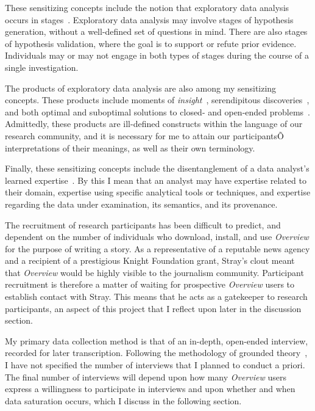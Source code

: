 These sensitizing concepts include the notion that exploratory data analysis occurs in stages~\cite{Pirolli2009}. 
Exploratory data analysis may involve stages of hypothesis generation, without a well-defined set of questions in mind. 
There are also stages of hypothesis validation, where the goal is to support or refute prior evidence. 
Individuals may or may not engage in both types of stages during the course of a single investigation. 

The products of exploratory data analysis are also among my sensitizing concepts. 
These products include moments of {\it insight}~\cite{Chang2009,North2006,Yi2008}, serendipitous discoveries~\cite{Andre2009}, and both optimal and suboptimal solutions to closed- and open-ended problems~\cite{Mayr2010}. 
Admittedly, these products are ill-defined constructs within the language of our research community, and it is necessary for me to attain our participantsÕ interpretations of their meanings, as well as their own terminology.

Finally, these sensitizing concepts include the disentanglement of a data analyst's learned expertise~\cite{Chang2010}. 
By this I mean that an analyst may have expertise related to their domain, expertise using specific analytical tools or techniques, and expertise regarding the data under examination, its semantics, and its provenance.

The recruitment of research participants has been difficult to predict, and dependent on the number of individuals who download, install, and use {\it Overview} for the purpose of writing a story. 
As a representative of a reputable news agency and a recipient of a prestigious Knight Foundation grant, Stray's clout meant that {\it Overview} would be highly visible to the journalism community. 
Participant recruitment is therefore a matter of waiting for prospective {\it Overview} users to establish contact with Stray. 
This means that he acts as a gatekeeper to research participants, an aspect of this project that I reflect upon later in the discussion section.

My primary data collection method is that of an in-depth, open-ended interview, recorded for later transcription. 
Following the methodology of grounded theory~\cite{Charmaz2006}, I have not specified the number of interviews that I planned to conduct a priori. 
The final number of interviews will depend upon how many {\it Overview} users express a willingness to participate in interviews and upon whether and when data saturation occurs, which I discuss in the following section. 

